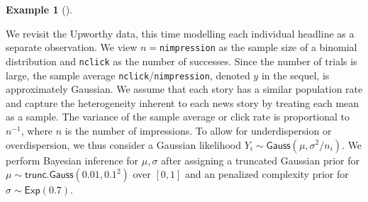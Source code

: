 \documentclass[
  11pt,
  letterpaper,
]{scrbook}
\theoremstyle{definition}
\theoremstyle{plain}
\theoremstyle{plain}
\theoremstyle{definition}
\newtheorem{example}{Example}[chapter]
\theoremstyle{definition}
\theoremstyle{remark}
\begin{document}
\begin{example}[]\protect\hypertarget{exm-normal-question-upworthy}{}\label{exm-normal-question-upworthy}

We revisit the Upworthy data, this time modelling each individual
headline as a separate observation. We view \(n=\)\texttt{nimpression}
as the sample size of a binomial distribution and \texttt{nclick} as the
number of successes. Since the number of trials is large, the sample
average \texttt{nclick}/\texttt{nimpression}, denoted \(y\) in the
sequel, is approximately Gaussian. We assume that each story has a
similar population rate and capture the heterogeneity inherent to each
news story by treating each mean as a sample. The variance of the sample
average or click rate is proportional to \(n^{-1}\), where \(n\) is the
number of impressions. To allow for underdispersion or overdispersion,
we thus consider a Gaussian likelihood
\(Y_i \sim \mathsf{Gauss}(\mu, \sigma^2/n_i)\). We perform Bayesian
inference for \(\mu, \sigma\) after assigning a truncated Gaussian prior
for \(\mu \sim \mathsf{trunc. Gauss}(0.01, 0.1^2)\) over \([0,1]\) and
an penalized complexity prior for \(\sigma \sim \mathsf{Exp}(0.7)\).


\end{example}
\end{document}

